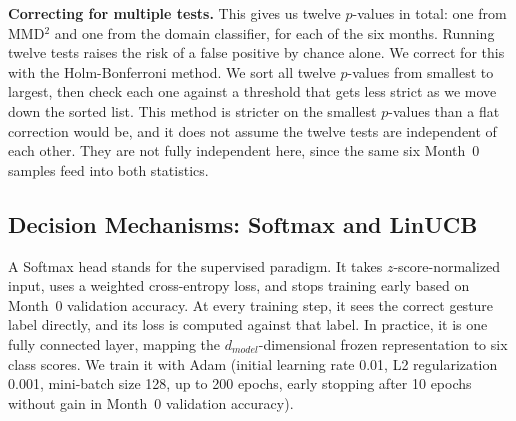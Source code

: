 \documentclass[journal]{IEEEtran}
\begin{document}
\textbf{Correcting for multiple tests.} This gives us twelve $p$-values in total: one from MMD$^2$ and one from the domain classifier, for each of the six months. Running twelve tests raises the risk of a false positive by chance alone. We correct for this with the Holm-Bonferroni method. We sort all twelve $p$-values from smallest to largest, then check each one against a threshold that gets less strict as we move down the sorted list. This method is stricter on the smallest $p$-values than a flat correction would be, and it does not assume the twelve tests are independent of each other. They are not fully independent here, since the same six Month~0 samples feed into both statistics.

\subsection{Decision Mechanisms: Softmax and LinUCB}
\label{sec:decision}
A Softmax head stands for the supervised paradigm. It takes $z$-score-normalized input, uses a weighted cross-entropy loss, and stops training early based on Month~0 validation accuracy. At every training step, it sees the correct gesture label directly, and its loss is computed against that label. In practice, it is one fully connected layer, mapping the $d_{model}$-dimensional frozen representation to six class scores. We train it with Adam (initial learning rate 0.01, L2 regularization 0.001, mini-batch size 128, up to 200 epochs, early stopping after 10 epochs without gain in Month~0 validation accuracy).
\end{document}
